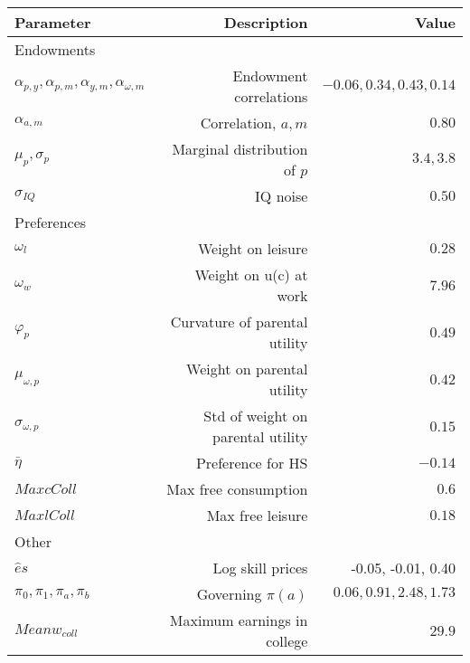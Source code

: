 \begin{tabular}{lrr}
\hline
Parameter & Description  & Value  \\
\hline
Endowments &   &   \\
$\alpha_{p,y}, \alpha_{p,m}, \alpha_{y,m}, \alpha_{\omega,m}$ & Endowment correlations  & $-0.06, 0.34, 0.43, 0.14$  \\
$\alpha_{a,m}$ & Correlation, $a,m$  & $0.80$  \\
$\mu_{p}, \sigma_{p}$ & Marginal distribution of $p$  & $3.4, 3.8$  \\
$\sigma_{IQ}$ & IQ noise  & $0.50$  \\
Preferences &   &   \\
$\omega_{l}$ & Weight on leisure  & $0.28$  \\
$\omega_{w}$ & Weight on u(c) at work  & $7.96$  \\
$\varphi_{p}$ & Curvature of parental utility  & $0.49$  \\
$\mu_{\omega,p}$ & Weight on parental utility  & $0.42$  \\
$\sigma_{\omega,p}$ & Std of weight on parental utility  & $0.15$  \\
$\bar{\eta}$ & Preference for HS  & $-0.14$  \\
$Max cColl$ & Max free consumption  & $0.6$  \\
$Max lColl$ & Max free leisure  & $0.18$  \\
Other &   &   \\
$\hat{e}{s}$ & Log skill prices  & -0.05, -0.01, 0.40  \\
$\pi_{0}, \pi_{1}, \pi_{a}, \pi_{b}$ & Governing $\pi(a)$  & $0.06, 0.91, 2.48, 1.73$  \\
$Mean w_{coll}$ & Maximum earnings in college  & $29.9$  \\
\hline
\end{tabular}%
